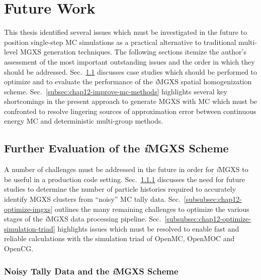 \section{Future Work}
\label{sec:chap12-future-work}

This thesis identified several issues which must be investigated in the future to position single-step \ac{MC} simulations as a practical alternative to traditional multi-level \ac{MGXS} generation techniques. The following sections itemize the author's assessment of the most important outstanding issues and the order in which they should be addressed. Sec.~\ref{subsec:chap12-further-imgxs} discusses case studies which should be performed to optimize and to evaluate the performance of the \textit{i}\ac{MGXS} spatial homogenization scheme. Sec.~\ref{subsec:chap12-improve-mc-methods} highlights several key shortcomings in the present approach to generate \ac{MGXS} with \ac{MC} which must be confronted to resolve lingering sources of approximation error between continuous energy \ac{MC} and deterministic multi-group methods.

\subsection{Further Evaluation of the \textit{i}MGXS Scheme}
\label{subsec:chap12-further-imgxs}

A number of challenges must be addressed in the future in order for \textit{i}\ac{MGXS} to be useful in a production code setting. Sec.~\ref{subsubsec:chap12-imgxs-noisy-mc-data} discusses the need for future studies to determine the number of particle histories required to accurately identify \ac{MGXS} clusters from ``noisy'' \ac{MC} tally data. Sec.~\ref{subsubsec:chap12-optimize-imgxs} outlines the many remaining challenges to optimize the various stages of the \textit{i}\ac{MGXS} data processing pipeline. Sec.~\ref{subsubsec:chap12-optimize-simulation-triad} highlights issues which must be resolved to enable fast and reliable calculations with the simulation triad of OpenMC, OpenMOC and OpenCG.

\subsubsection{Noisy Tally Data and the \textit{i}MGXS Scheme}
\label{subsubsec:chap12-imgxs-noisy-mc-data}

